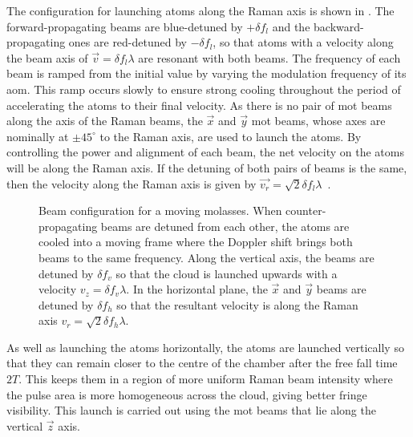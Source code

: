 The configuration for launching atoms along the Raman axis is shown in
. The forward-propagating beams are
blue-detuned by \(+\delta f_l\) and the backward-propagating ones are
red-detuned by \(-\delta f_l\), so that atoms with a velocity along the
beam axis of \(\vec{v} = \delta f_l \lambda\) are resonant with both
beams. The frequency of each beam is ramped from the initial value by
varying the modulation frequency of its \ac{aom}. This ramp occurs
slowly to ensure strong cooling throughout the period of accelerating
the atoms to their final velocity. As there is
no pair of \ac{mot} beams along the axis of the Raman beams, the
\(\vec{x}\) and \(\vec{y}\) \ac{mot} beams, whose axes are nominally
at $\pm45^{\circ}$ to the Raman axis, are used to launch the atoms. By
controlling the power and alignment of each beam, the net velocity on
the atoms will be along the Raman axis. If the detuning of both pairs
of beams is the same, then the velocity along the Raman axis is given
by \(\vec{v_r} = \sqrt{2} \delta f_l \lambda\)~\cite{Ohshima1995}.
\begin{figure}[!htbp]
    \centering
    \def\svgwidth{0.6\textwidth}
    \caption[Beam configuration for a moving molasses]{Beam
    configuration for a moving molasses. When counter-propagating
  beams are detuned from each other, the atoms are cooled into a
  moving frame where the Doppler shift brings both beams to the same
  frequency. Along the vertical
axis, the beams are detuned by \(\delta f_v\) so that the cloud is
launched upwards with a velocity \(v_z = \delta f_v \lambda\). In the
horizontal plane, the \(\vec{x}\) and \(\vec{y}\) beams are detuned by
\(\delta f_h\) so that the resultant velocity is along the Raman axis
\(v_r = \sqrt{2}\delta f_h\lambda\). }
    \label{fig:moving_molasses}
\end{figure}
\par\noindent
As well as launching the atoms horizontally, the atoms are launched
vertically so that they can remain closer to the centre of the chamber
after the free fall time $2T$. This keeps them in a region of more
uniform Raman beam intensity where the pulse area is more homogeneous
across the cloud, giving better fringe visibility. This launch is carried out using the \ac{mot} beams that lie along the
vertical \(\vec{z}\) axis. 
\par\noindent
